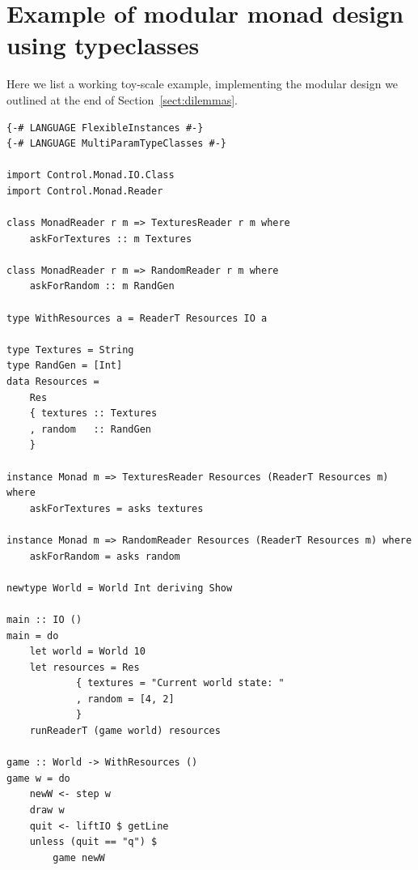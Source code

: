 \documentclass[
  digital, %
  color,   %
  table,   %
  oneside, %
  lof,     %
  lot,     %
]{fithesis3}
\begin{document}
{%
\printbibliography[heading=bibintoc] %






\appendix %

\chapter{Example of modular monad design using typeclasses}
\label{app:classes}

Here we list a working toy-scale example, implementing the modular design
we outlined at the end of Section~\ref{sect:dilemmas}.

\begin{verbatim}
{-# LANGUAGE FlexibleInstances #-}
{-# LANGUAGE MultiParamTypeClasses #-}

import Control.Monad.IO.Class
import Control.Monad.Reader

class MonadReader r m => TexturesReader r m where
    askForTextures :: m Textures

class MonadReader r m => RandomReader r m where
    askForRandom :: m RandGen

type WithResources a = ReaderT Resources IO a

type Textures = String
type RandGen = [Int]
data Resources =
    Res
    { textures :: Textures
    , random   :: RandGen
    }

instance Monad m => TexturesReader Resources (ReaderT Resources m) where
    askForTextures = asks textures

instance Monad m => RandomReader Resources (ReaderT Resources m) where
    askForRandom = asks random

newtype World = World Int deriving Show

main :: IO ()
main = do
    let world = World 10
    let resources = Res  
            { textures = "Current world state: "
            , random = [4, 2]
            }
    runReaderT (game world) resources  

game :: World -> WithResources ()
game w = do
    newW <- step w
    draw w
    quit <- liftIO $ getLine
    unless (quit == "q") $
        game newW


\end{verbatim}}
\end{document}
